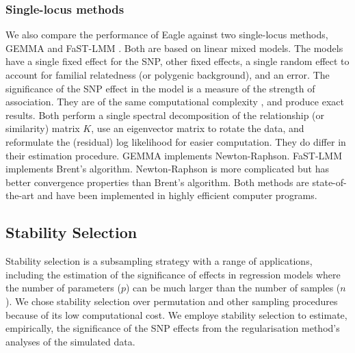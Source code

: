 \documentclass{article}
\begin{document}
\subsubsection{Single-locus methods}

We also compare the performance of Eagle against two single-locus methods, GEMMA \cite{zhou2012genome} and FaST-LMM \cite{lippert2011fast}. Both are based on linear mixed models. The models have a single fixed effect for the SNP,  other fixed effects, 
a single random effect to account for familial relatedness (or polygenic background), and an error. The significance of the SNP effect in the model 
is a measure of the strength of association.  They are of the same computational complexity \cite{zhou2012genome}, and produce exact results.  
Both perform a single spectral decomposition of the relationship (or similarity) matrix $K$, use  an eigenvector matrix to rotate the data, 
and reformulate the (residual) log likelihood for easier computation. They do differ in their estimation procedure. GEMMA implements Newton-Raphson. 
FaST-LMM implements Brent's algorithm. Newton-Raphson is more complicated but has better convergence properties than Brent's algorithm. 
Both methods are state-of-the-art and have been implemented in highly efficient computer programs. 



\subsection{Stability Selection}
Stability selection \cite{meinshausen2010stability}  is a subsampling strategy with a range of applications, including the estimation of the significance of effects in regression models where 
the number of parameters ($p$) can be much larger than the number of samples ($n$). We chose stability selection over permutation and other sampling procedures because of its low computational cost. We employe stability selection to estimate, empirically, the significance of the SNP effects from the regularisation method's analyses of the simulated data.
\end{document}

